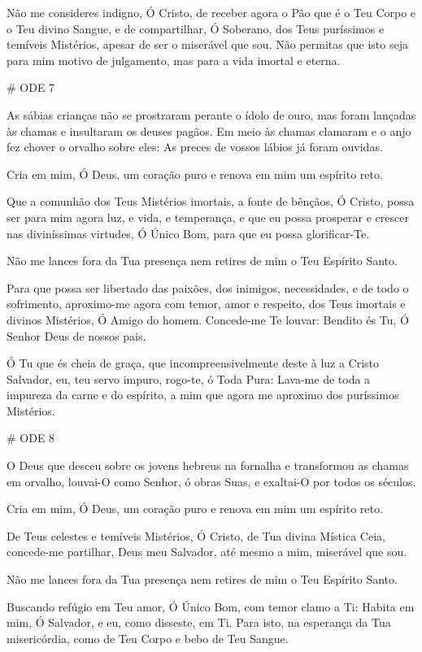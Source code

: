 \documentclass{subfiles}
\begin{document}
Não me consideres indigno, Ó Cristo, de receber agora o Pão que é o Teu Corpo e
o Teu divino Sangue, e de compartilhar, Ó Soberano, dos Teus puríssimos e
temíveis Mistérios, apesar de ser o miserável que sou. Não permitas que isto
seja para mim motivo de julgamento, mas para a vida imortal e eterna.

# ODE 7

\eirmos{}As sábias crianças não se prostraram perante o ídolo de ouro, mas
foram lançadas às chamas e insultaram os deuses pagãos. Em meio às chamas
clamaram e o anjo fez chover o orvalho sobre eles: As preces de vossos lábios
já foram ouvidas.

Cria em mim, Ó Deus, um coração puro e renova em mim um espírito reto.

Que a comunhão dos Teus Mistérios imortais, a fonte de bênçãos, Ó
Cristo, possa ser para mim agora luz, e vida, e temperança, e que eu possa
prosperar e crescer nas diviníssimas virtudes, Ó Único Bom, para que eu possa
glorificar-Te.

Não me lances fora da Tua presença nem retires de mim o Teu Espírito Santo.

Para que possa ser libertado das paixões, dos inimigos, necessidades,
e de todo o sofrimento, aproximo-me agora com temor, amor e respeito, dos
Teus imortais e divinos Mistérios, Ó Amigo do homem. Concede-me Te louvar:
Bendito és Tu, Ó Senhor Deus de nossos pais.

\Doxology{}

Ó Tu que és cheia de graça, que incompreensivelmente deste à luz a Cristo
Salvador, eu, teu servo impuro, rogo-te, ó Toda Pura: Lava-me de toda a impureza
da carne e do espírito, a mim que agora me aproximo dos puríssimos Mistérios.

# ODE 8

\eirmos{}O Deus que desceu sobre os jovens hebreus na fornalha e transformou
as chamas em orvalho, louvai-O como Senhor, ó obras Suas, e exaltai-O por
todos os séculos.

Cria em mim, Ó Deus, um coração puro e renova em mim um espírito reto.

De Teus celestes e temíveis Mistérios, Ó Cristo, de Tua divina Mística
Ceia, concede-me partilhar, Deus meu Salvador, até mesmo a mim, miserável
que sou.

Não me lances fora da Tua presença nem retires de mim o Teu Espírito Santo.

Buscando refúgio em Teu amor, Ó Único Bom, com temor clamo a Ti: Habita em mim,
Ó Salvador, e eu, como disseste, em Ti. Para isto, na esperança da Tua
misericórdia, como de Teu Corpo e bebo de Teu Sangue.
\end{document}
